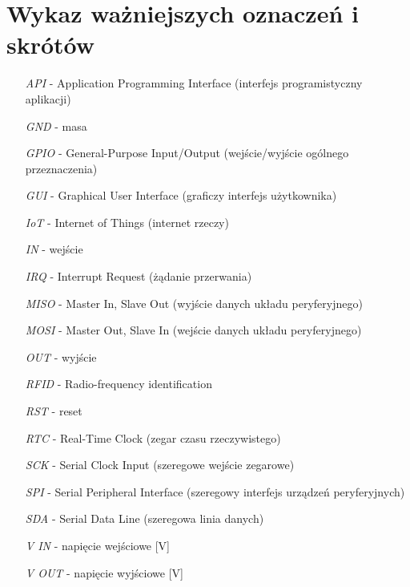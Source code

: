 \section*{Wykaz ważniejszych oznaczeń i skrótów}


	\begin{itemize}
		\item[\textit{API}] - Application Programming Interface (interfejs programistyczny aplikacji)
		\item[\textit{GND}] - masa
		\item[\textit{GPIO}] - General-Purpose Input/Output (wejście/wyjście ogólnego przeznaczenia)
		\item[\textit{GUI}] - Graphical User Interface (graficzy interfejs użytkownika)
		\item[\textit{IoT}] - Internet of Things (internet rzeczy)
		\item[\textit{IN}] - wejście
		\item[\textit{IRQ}] - Interrupt Request (żądanie przerwania)
		\item[\textit{MISO}] - Master In, Slave Out (wyjście danych układu peryferyjnego)
		\item[\textit{MOSI}] - Master Out, Slave In (wejście danych układu peryferyjnego)
		\item[\textit{OUT}] - wyjście
		\item[\textit{RFID}] - Radio-frequency identification
		\item[\textit{RST}] - reset
		\item[\textit{RTC}] - Real-Time Clock (zegar czasu rzeczywistego)
		\item[\textit{SCK}] - Serial Clock Input (szeregowe wejście zegarowe)
		\item[\textit{SPI}] - Serial Peripheral Interface (szeregowy interfejs urządzeń peryferyjnych)
		\item[\textit{SDA}] - Serial Data Line (szeregowa linia danych)
		\item[\textit{V IN}] - napięcie wejściowe [V]
		\item[\textit{V OUT}] - napięcie wyjściowe [V]

	\end{itemize}



